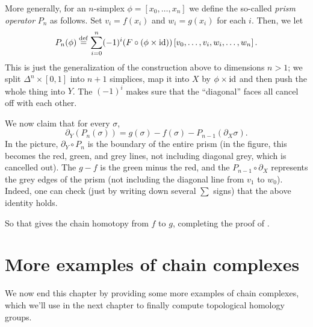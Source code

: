 More generally, for an $n$-simplex $\phi = [x_0, \dots, x_n]$
we define the so-called \emph{prism operator} $P_n$
as follows. Set $v_i = f(x_i)$ and $w_i = g(x_i)$ for each $i$.
Then, we let
\[ P_n(\phi) \overset{\mathrm{def}}{=} \sum_{i=0}^n (-1)^i (F \circ (\phi\times\mathrm{id}))
	\left[ v_0, \dots, v_i, w_i, \dots, w_n \right]. \]
This is just the generalization of the construction above to dimensions $n > 1$;
we split $\Delta^n \times [0,1]$ into $n+1$ simplices,
map it into $X$ by $\phi \times \mathrm{id}$ and then push the whole thing into $Y$.
The $(-1)^i$ makes sure that the ``diagonal'' faces all cancel off with each other.

We now claim that for every $\sigma$,
\[ \partial_Y(P_n(\sigma)) = g(\sigma) - f(\sigma) - P_{n-1}(\partial_X\sigma). \]
In the picture, $\partial_Y \circ P_n$ is the boundary of the entire prism
(in the figure, this becomes the red, green, and grey lines, not including diagonal grey,
which is cancelled out).
The $g-f$ is the green minus the red,
and the $P_{n-1} \circ \partial_X$ represents the grey edges of the prism
(not including the diagonal line from $v_1$ to $w_0$).
Indeed, one can check (just by writing down several $\sum$ signs)
that the above identity holds.

So that gives the chain homotopy from $f$ to $g$, completing the proof of .

\section{More examples of chain complexes}
We now end this chapter by providing some more examples of chain complexes,
which we'll use in the next chapter to finally compute topological homology groups.

